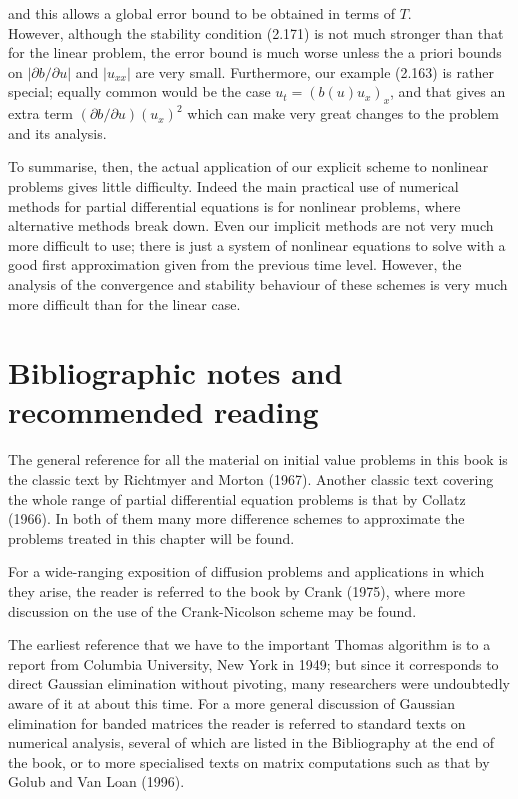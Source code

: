 \documentclass[10pt]{article}
\begin{document}
and this allows a global error bound to be obtained in terms of \(T\).\\
However, although the stability condition (2.171) is not much stronger than that for the linear problem, the error bound is much worse unless the a priori bounds on \(|\partial b / \partial u|\) and \(\left|u_{x x}\right|\) are very small. Furthermore, our example (2.163) is rather special; equally common would be the case \(u_{t}=\left(b(u) u_{x}\right)_{x}\), and that gives an extra term \((\partial b / \partial u)\left(u_{x}\right)^{2}\) which can make very great changes to the problem and its analysis.

To summarise, then, the actual application of our explicit scheme to nonlinear problems gives little difficulty. Indeed the main practical use of numerical methods for partial differential equations is for nonlinear problems, where alternative methods break down. Even our implicit methods are not very much more difficult to use; there is just a system of nonlinear equations to solve with a good first approximation given from the previous time level. However, the analysis of the convergence and stability behaviour of these schemes is very much more difficult than for the linear case.

\section*{Bibliographic notes and recommended reading}
The general reference for all the material on initial value problems in this book is the classic text by Richtmyer and Morton (1967). Another classic text covering the whole range of partial differential equation problems is that by Collatz (1966). In both of them many more difference schemes to approximate the problems treated in this chapter will be found.

For a wide-ranging exposition of diffusion problems and applications in which they arise, the reader is referred to the book by Crank (1975), where more discussion on the use of the Crank-Nicolson scheme may be found.

The earliest reference that we have to the important Thomas algorithm is to a report from Columbia University, New York in 1949; but since it corresponds to direct Gaussian elimination without pivoting, many researchers were undoubtedly aware of it at about this time. For a more general discussion of Gaussian elimination for banded matrices the reader is referred to standard texts on numerical analysis, several of which are listed in the Bibliography at the end of the book, or to more specialised texts on matrix computations such as that by Golub and Van Loan (1996).
\end{document}
